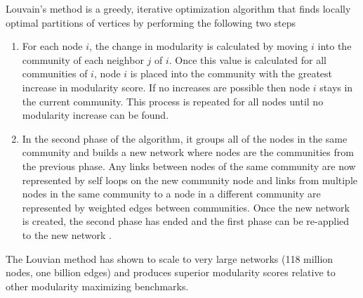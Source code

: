 \documentclass[../thesis.tex]{subfiles}
\begin{document}
Louvain's method is a greedy, iterative optimization algorithm that finds locally optimal partitions of vertices by performing the following two steps
\begin{enumerate}
    \item For each node $i$, the change in modularity is calculated by moving $i$ into the community of each neighbor $j$ of $i$. Once this value is calculated for all communities of $i$, node $i$ is placed into the community with the greatest increase in modularity score. If no increases are possible then node $i$ stays in the current community. This process is repeated for all nodes until no modularity increase can be found.
    \item In the second phase of the algorithm, it groups all of the nodes in the same community and builds a new network where nodes are the communities from the previous phase. Any links between nodes of the same community are now represented by self loops on the new community node and links from multiple nodes in the same community to a node in a different community are represented by weighted edges between communities. Once the new network is created, the second phase has ended and the first phase can be re-applied to the new network \cite{blondel2008fast}.
\end{enumerate}
The Louvian method has shown to scale to very large networks (118 million nodes, one billion edges) and produces superior modularity scores relative to other modularity maximizing benchmarks.
\end{document}
